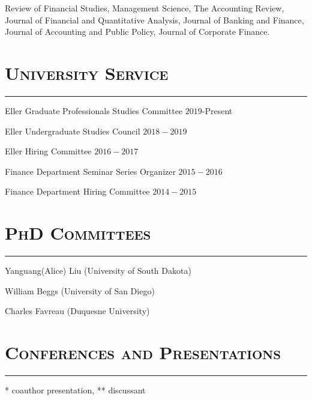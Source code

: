 \documentclass[10pt,letterpaper]{article}
\renewenvironment{itemize}{
  \begin{list}{}{
    \setlength{\leftmargin}{1.5em}
    \setlength{\itemsep}{0.25em}
    \setlength{\parskip}{0pt}
    \setlength{\parsep}{0.25em}
  }
}{
  \end{list}
}
\begin{document}
\begin{itemize}
\item Review of Financial Studies, Management Science, The Accounting Review, Journal of Financial and Quantitative Analysis, Journal of Banking and Finance, Journal of Accounting and Public Policy, Journal of Corporate Finance.
\end{itemize}

\section*{\textsc{University Service}}
\nointerlineskip
\vspace{-3mm}
\rule{\textwidth}{0.5mm}

\begin{itemize}
\item Eller Graduate Professionals Studies Committee \hfill $2019$-Present
\item Eller Undergraduate Studies Council \hfill $2018-2019$
\item Eller Hiring Committee \hfill $2016-2017$
\item Finance Department Seminar Series Organizer \hfill $2015-2016$
\item Finance Department Hiring Committee \hfill $2014-2015$
\end{itemize}

\section*{\textsc{PhD Committees}}
\nointerlineskip
\vspace{-3mm}
\rule{\textwidth}{0.5mm}

\begin{itemize}
\item Yanguang(Alice) Liu (University of South Dakota)
\end{itemize}

\begin{itemize}
\item William Beggs (University of San Diego)
\end{itemize}

\begin{itemize}
\item Charles Favreau (Duquesne University)
\end{itemize}






\section*{\textsc{Conferences and Presentations}}
\nointerlineskip
\vspace{-3mm}
\rule{\textwidth}{0.5mm}
* coauthor presentation, ** discussant
\end{document}
